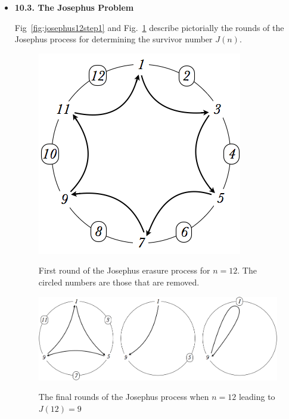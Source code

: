 \begin{itemize}

\item
{\bf 10.3. The Josephus Problem}
\medskip

 Fig~\ref{fig:josephus12step1} and Fig.~\ref{fig:josephus12step2} describe pictorially the rounds of the Josephus process
 for determining the survivor number $J(n)$.
\begin{figure}[ht]
\begin{center}
        \includegraphics[scale=0.3]{FiguresMaths/josephus12step1}
\caption{First round of the Josephus erasure process for $n=12$. The circled numbers are those that are removed.}
        \label{fig:josephus12step1} 
        \includegraphics[scale=0.3]{FiguresMaths/josephus12LastSteps}
        \caption{The final rounds of the Josephus process when $n=12$ leading to $J(12) = 9$}
        \label{fig:josephus12step2}
\end{center}
\end{figure}


\end{itemize}
